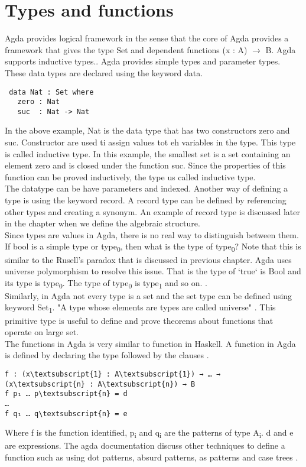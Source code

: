 \section{Types and functions}
Agda provides logical framework in the sense that the core of Agda provides a framework that gives the type Set and dependent functions (x : A) \(\rightarrow\) B. Agda supports inductive types.\cite{10.1007/978-3-642-03359-9_6}. Agda provides simple types and parameter types. These data types are declared using the keyword data. \\
\begin{Verbatim}
 data Nat : Set where
   zero : Nat
   suc  : Nat -> Nat
\end{Verbatim}
In the above example, Nat is the data type that has two constructors zero and suc. Constructor are used ti assign values tot eh variables in the type. This type is called inductive type. In this example, the smallest set is a set containing an element zero and is closed under the function suc. Since the properties of this function can be proved inductively, the type us called inductive type. \cite{enwiki:1127496533}\\ The datatype can be have parameters and	 indexed.  
Another way of defining a type is using the keyword record. A record type can be defined by referencing other types and creating a synonym. An example of record type is discussed later in the chapter when we define the algebraic structure.\\
Since types are values in Agda, there is no real way to distinguish between them. If bool is a simple type or type\textsubscript{0}, then what is the type of type\textsubscript{0}? Note that this is similar to the Rusell's paradox that is discussed in previous chapter. Agda uses universe polymorphism to resolve this issue. That is the type of `true` is Bool and its type is type\textsubscript{0}. The type of  type\textsubscript{0} is type\textsubscript{1} and so on. \cite{kidney2020finiteness}.\\
Similarly, in Agda not every type is a set and the set type can be defined using keyword Set\textsubscript{1}. "A type whose elements are types are called universe" \cite{universeagda}. This primitive type is useful to define and prove theorems about functions that operate on large set.\\

The functions in Agda is very similar to function in Haskell. A function in Agda is defined by declaring the type followed by the clauses \cite{agdaFunction}. 
\begin{Verbatim}[commandchars=\\\{\},samepage=true]
f : (x\textsubscript{1} : A\textsubscript{1}) → … → (x\textsubscript{n} : A\textsubscript{n}) → B
f p₁ … p\textsubscript{n} = d
…
f q₁ … q\textsubscript{n} = e
\end{Verbatim} 
Where f is the function identified, p\textsubscript{i} and q\textsubscript{i} are the patterns of type A\textsubscript{i}. d and e are expressions. 
The agda documentation discuss other techniques to define a function such as using dot patterns, absurd patterns, as patterns and case trees \cite{agdaFunction}.\\

